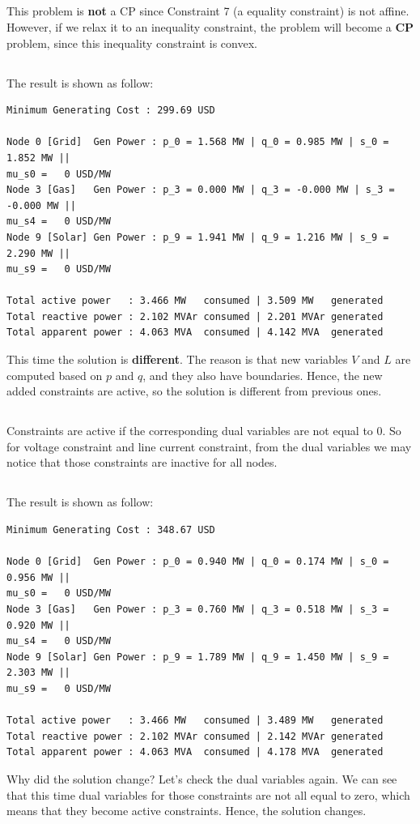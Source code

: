 \documentclass[12pt]{article}
\begin{document}
\subsection{}
This problem is \textbf{not} a CP since Constraint 7 (a equality constraint) is not affine. However, if we relax it to an inequality constraint, the problem will become a \textbf{CP} problem, since this inequality constraint is convex.
\subsection{}
The result is shown as follow:
\begin{verbatim}
Minimum Generating Cost : 299.69 USD

Node 0 [Grid]  Gen Power : p_0 = 1.568 MW | q_0 = 0.985 MW | s_0 = 1.852 MW || 
mu_s0 =   0 USD/MW
Node 3 [Gas]   Gen Power : p_3 = 0.000 MW | q_3 = -0.000 MW | s_3 = -0.000 MW || 
mu_s4 =   0 USD/MW
Node 9 [Solar] Gen Power : p_9 = 1.941 MW | q_9 = 1.216 MW | s_9 = 2.290 MW || 
mu_s9 =   0 USD/MW

Total active power   : 3.466 MW   consumed | 3.509 MW   generated
Total reactive power : 2.102 MVAr consumed | 2.201 MVAr generated
Total apparent power : 4.063 MVA  consumed | 4.142 MVA  generated
\end{verbatim}
This time the solution is \textbf{different}. The reason is that new variables $V$ and $L$ are computed based on $p$ and $q$, and they also have boundaries. Hence, the new added constraints are active, so the solution is different from previous ones.
\newpage
\subsection{}
Constraints are active if the corresponding dual variables are not equal to 0. So for voltage constraint and line current constraint, from the dual variables we may notice that those constraints are inactive for all nodes.
\subsection{}
The result is shown as follow:
\begin{verbatim}
Minimum Generating Cost : 348.67 USD

Node 0 [Grid]  Gen Power : p_0 = 0.940 MW | q_0 = 0.174 MW | s_0 = 0.956 MW || 
mu_s0 =   0 USD/MW
Node 3 [Gas]   Gen Power : p_3 = 0.760 MW | q_3 = 0.518 MW | s_3 = 0.920 MW || 
mu_s4 =   0 USD/MW
Node 9 [Solar] Gen Power : p_9 = 1.789 MW | q_9 = 1.450 MW | s_9 = 2.303 MW || 
mu_s9 =   0 USD/MW

Total active power   : 3.466 MW   consumed | 3.489 MW   generated
Total reactive power : 2.102 MVAr consumed | 2.142 MVAr generated
Total apparent power : 4.063 MVA  consumed | 4.178 MVA  generated
\end{verbatim}
Why did the solution change? Let's check the dual variables again. We can see that this time dual variables for those constraints are not all equal to zero, which means that they become active constraints. Hence, the solution changes.
\end{document}
